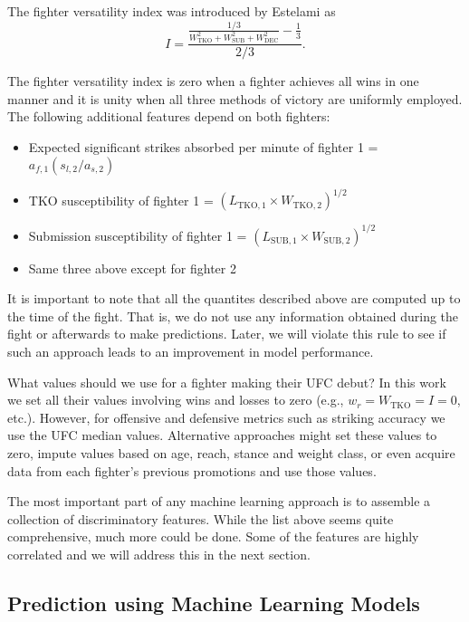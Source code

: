 \noindent
The fighter versatility index was introduced by Estelami as
\begin{equation}
I = \frac{\frac{1/3}{W_{\textrm{TKO}}^2+W_{\textrm{SUB}}^2+W_{\textrm{DEC}}^2}-\frac{1}{3}}{2/3}.
\end{equation}

\noindent
The fighter versatility index is zero when a fighter achieves all wins in one manner and
it is unity when all three methods of victory are uniformly employed.\\

\noindent
The following additional features depend on both fighters:

\begin{itemize}[noitemsep]
  \item Expected significant strikes absorbed per minute of fighter 1 = $a_{f,1} (s_{l,2}/a_{s,2})$
  \item TKO susceptibility of fighter 1 = $(L_{\textrm{TKO},1} \times W_{\textrm{TKO},2})^{1/2}$
  \item Submission susceptibility of fighter 1 = $(L_{\textrm{SUB},1} \times W_{\textrm{SUB},2})^{1/2}$
  \item Same three above except for fighter 2
\end{itemize}

It is important to note that all the quantites described above are computed
up to the time of the fight. That is, we do not use any information
obtained during the fight or afterwards to make predictions.
Later, we will violate this rule to see if such an approach
leads to an improvement in model performance.

What values should we use for a fighter making their UFC debut? In this work
we set all their values involving wins and losses to
zero (e.g., $w_r=W_{\textrm{TKO}}=I=0$, etc.). However, for
offensive and defensive metrics such as striking accuracy we use the UFC median values.
Alternative approaches might set these values to zero, impute values based
on age, reach, stance and weight class, or even acquire data from
each fighter's previous promotions and use those
values.

The most important part of any machine learning approach is
to assemble a collection of discriminatory features. While the
list above seems quite comprehensive, much more could be done.
Some of the features are highly correlated and
we will address this in the next section.


\subsection*{Prediction using Machine Learning Models}

